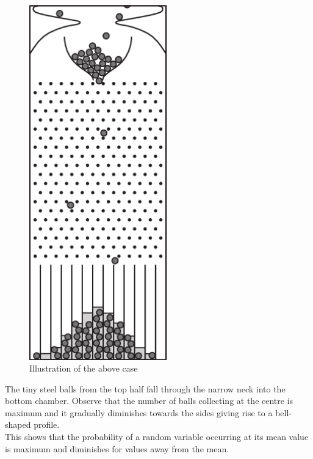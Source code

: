 \documentclass{article}
\begin{document}
 \begin{figure}[htbp]
    \centerline{\includegraphics[width=6cm]{curve.png}}
    \caption{Illustration of the above case}
    \label{fig:mesh1}
\end{figure}

The tiny steel balls from the top half fall through the narrow neck into the bottom chamber. Observe that the number of balls collecting at the centre is maximum and it gradually diminishes towards the sides giving rise to a bell-shaped profile.
 \\ This shows that the probability of a random variable occurring at its mean value is maximum and diminishes for values away from the mean.
 \cite{enwiki:1026848272}
 \cite{article}
 \newpage


\end{document}
